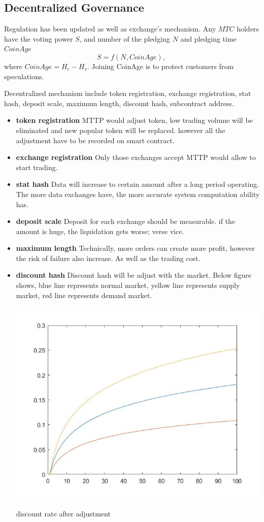 \documentclass[UTF8,nofonts]{article}
\makeatletter
\newenvironment{figurehere}
 {\def\@captype{figure}}
 {}
\makeatother
\begin{document}
\subsection{Decentralized Governance}
Regulation has been updated as well as exchange's mechanism. Any $MTC$ holders have the voting power $S$, and number of the pledging $N$ and pledging time $CoinAge$
$$S = f(N,  CoinAge)\text{, }$$
where $CoinAge = H_{c}-H_{s}$. Joining CoinAge is to protect customers from speculations.

Decentralized mechanism include token registration, exchange registration, stat hash, deposit scale, maximum length, discount hash, subcontract address.
 \begin{itemize}
   \item \textbf{token registration} MTTP would adjust token,  low trading volume will be eliminated and new popular token will be replaced. however all the adjustment have to be recorded on smart contract.
  \item \textbf{exchange registration} Only those exchanges accept MTTP would allow to start trading.
   \item \textbf{stat hash} Data will increase to certain amount after a long period operating. The more data exchanges have,  the more accurate system computation ability has.
  \item \textbf{deposit scale} Deposit for each exchange should be measurable. if the amount is huge,  the liquidation gets worse; verse vice.
   \item \textbf{maximum length} Technically, more orders can create more profit,  however the risk of failure also increase. As well as the trading cost.
   \item \textbf{discount hash} Discount hash will be adjust with the market. Below figure shows, blue line represents normal market, yellow line represents supply market, red line represents demand market.
\begin{center}
\begin{figurehere}
\includegraphics[height=10cm]{images/rate_adjust.jpg}
\caption{discount rate after adjustment}
\label{fig: dischargeRateAdjust}
\end{figurehere}
\end{center}


\end{itemize}
\end{document}
